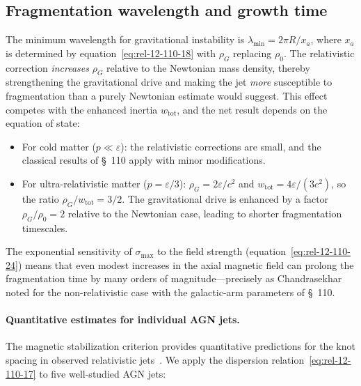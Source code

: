 \subsection{Fragmentation wavelength and growth time}
\label{sec:rel-12-110-fragment}

The minimum wavelength for gravitational instability is
$\lambda_{\min} = 2\pi R/x_{a}$, where $x_{a}$ is determined by
equation~\eqref{eq:rel-12-110-18} with $\rho_{G}$ replacing
$\rho_{0}$.  The relativistic correction \emph{increases} $\rho_{G}$
relative to the Newtonian mass density, thereby strengthening the
gravitational drive and making the jet \emph{more} susceptible to
fragmentation than a purely Newtonian estimate would suggest.  This
effect competes with the enhanced inertia $w_{\mathrm{tot}}$, and the
net result depends on the equation of state:

\begin{itemize}
\item For cold matter ($p \ll \varepsilon$):  the relativistic
  corrections are small, and the classical results of \S~110 apply
  with minor modifications.
\item For ultra-relativistic matter ($p = \varepsilon/3$):
  $\rho_{G} = 2\varepsilon/c^{2}$ and
  $w_{\mathrm{tot}} = 4\varepsilon/(3c^{2})$, so the ratio
  $\rho_{G}/w_{\mathrm{tot}} = 3/2$.  The gravitational drive is
  enhanced by a factor $\rho_{G}/\rho_{0} = 2$ relative to the
  Newtonian case, leading to shorter fragmentation timescales.
\end{itemize}

The exponential sensitivity of $\sigma_{\max}$ to the field
strength (equation~\eqref{eq:rel-12-110-24}) means that even modest
increases in the axial magnetic field can prolong the fragmentation
time by many orders of magnitude---precisely as Chandrasekhar noted
for the non-relativistic case with the galactic-arm parameters of
\S~110.

\paragraph{Quantitative estimates for individual AGN jets.}
The magnetic stabilization criterion provides quantitative predictions
for the knot spacing in observed relativistic
jets~\cite{Blandford2019}.  We apply the dispersion
relation~\eqref{eq:rel-12-110-17} to five well-studied AGN jets:


